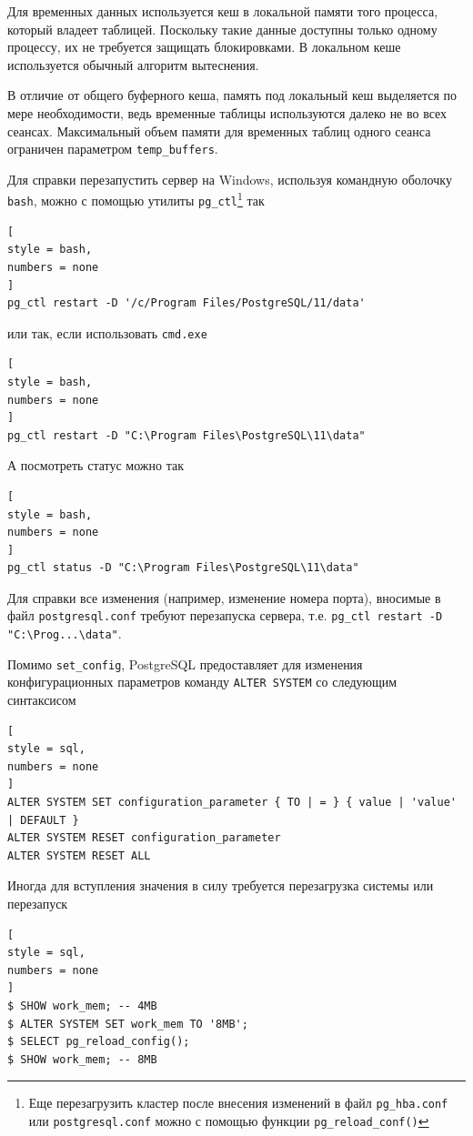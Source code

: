 \documentclass[%
	11pt,
	a4paper,
	utf8,
		]{article}
\begin{document}
Для временных данных используется кеш в локальной памяти того процесса, который владеет таблицей. Поскольку такие данные доступны только одному процессу, их не требуется защищать блокировками. В локальном кеше используется обычный алгоритм вытеснения. 

В отличие от общего буферного кеша, память под локальный кеш выделяется по мере необходимости, ведь временные таблицы используются далеко не во всех сеансах. Максимальный объем памяти для временных таблиц одного сеанса ограничен параметром \verb|temp_buffers|.

Для справки перезапустить сервер на Windows, используя командную оболочку \texttt{bash}, можно с помощью утилиты \verb|pg_ctl|\footnote{Еще перезагрузить кластер после внесения изменений в файл \texttt{pg\_hba.conf} или \texttt{postgresql.conf} можно с помощью функции \texttt{pg\_reload\_conf()}} так
\begin{lstlisting}[
style = bash,
numbers = none
]
pg_ctl restart -D '/c/Program Files/PostgreSQL/11/data'
\end{lstlisting}
или так, если использовать \texttt{cmd.exe}
\begin{lstlisting}[
style = bash,
numbers = none
]
pg_ctl restart -D "C:\Program Files\PostgreSQL\11\data"
\end{lstlisting}

А посмотреть статус можно так
\begin{lstlisting}[
style = bash,
numbers = none
]
pg_ctl status -D "C:\Program Files\PostgreSQL\11\data"
\end{lstlisting}

Для справки все изменения (например, изменение номера порта), вносимые в файл \texttt{postgresql.conf} требуют перезапуска сервера, т.е. \verb|pg_ctl restart -D "C:\Prog...\data"|.

Помимо \texttt{set\_config}, PostgreSQL предоставляет для изменения конфигурационных параметров команду \texttt{ALTER SYSTEM} со следующим синтаксисом
\begin{lstlisting}[
style = sql,
numbers = none
]
ALTER SYSTEM SET configuration_parameter { TO | = } { value | 'value' | DEFAULT }
ALTER SYSTEM RESET configuration_parameter
ALTER SYSTEM RESET ALL
\end{lstlisting}

Иногда для вступления значения в силу требуется перезагрузка системы или перезапуск
\begin{lstlisting}[
style = sql,
numbers = none
]
$ SHOW work_mem; -- 4MB
$ ALTER SYSTEM SET work_mem TO '8MB';
$ SELECT pg_reload_config();
$ SHOW work_mem; -- 8MB
\end{lstlisting}
\end{document}
